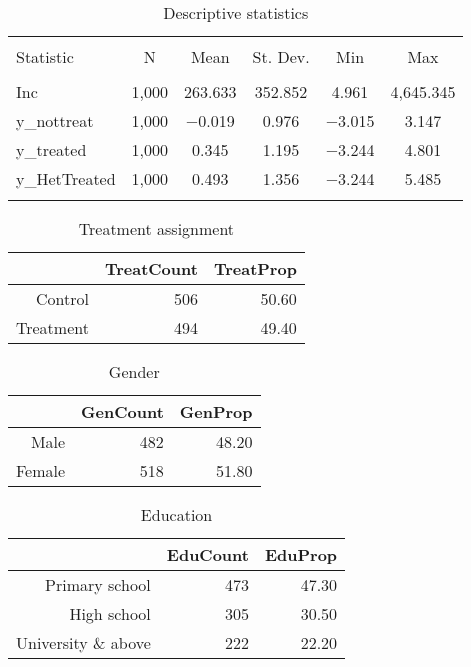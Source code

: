 \documentclass[11pt, a4paper]{article}\usepackage[]{graphicx}\usepackage[]{color}
\begin{document}
\begin{table}[!htbp] \centering 
  \caption{Descriptive statistics} 
  \label{} 
\begin{tabular}{@{\extracolsep{5pt}}lccccc} 
\\[-1.8ex]\hline 
\hline \\[-1.8ex] 
Statistic & \multicolumn{1}{c}{N} & \multicolumn{1}{c}{Mean} & \multicolumn{1}{c}{St. Dev.} & \multicolumn{1}{c}{Min} & \multicolumn{1}{c}{Max} \\ 
\hline \\[-1.8ex] 
Inc & 1,000 & 263.633 & 352.852 & 4.961 & 4,645.345 \\ 
y\_nottreat & 1,000 & $-$0.019 & 0.976 & $-$3.015 & 3.147 \\ 
y\_treated & 1,000 & 0.345 & 1.195 & $-$3.244 & 4.801 \\ 
y\_HetTreated & 1,000 & 0.493 & 1.356 & $-$3.244 & 5.485 \\ 
\hline \\[-1.8ex] 
\end{tabular} 
\end{table} 
\begin{table}[ht]
\centering
\caption{Treatment assignment} 
\begin{tabular}{rrr}
  \hline
 & TreatCount & TreatProp \\ 
  \hline
Control & 506 & 50.60 \\ 
  Treatment & 494 & 49.40 \\ 
   \hline
\end{tabular}
\end{table}
\begin{table}[ht]
\centering
\caption{Gender} 
\begin{tabular}{rrr}
  \hline
 & GenCount & GenProp \\ 
  \hline
Male & 482 & 48.20 \\ 
  Female & 518 & 51.80 \\ 
   \hline
\end{tabular}
\end{table}
\begin{table}[ht]
\centering
\caption{Education} 
\begin{tabular}{rrr}
  \hline
 & EduCount & EduProp \\ 
  \hline
Primary school & 473 & 47.30 \\ 
  High school & 305 & 30.50 \\ 
  University \& above & 222 & 22.20 \\ 
   \hline
\end{tabular}
\end{table}
\end{document}
